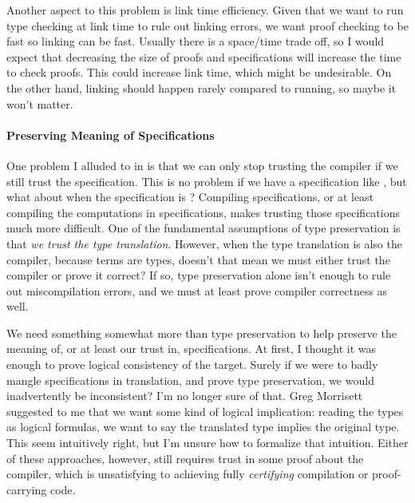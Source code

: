 Another aspect to this problem is link time efficiency.
Given that we want to run type checking at link time to rule out linking errors,
we want proof checking to be fast so linking can be fast.
Usually there is a space/time trade off, so I would expect that decreasing the
size of proofs and specifications will increase the time to check proofs.
This could increase link time, which might be undesirable.
On the other hand, linking should happen rarely compared to running, so maybe it
won't matter.

\paragraph{Preserving Meaning of Specifications}
One problem I alluded to in  is that we can only stop %
trusting the compiler if we still trust the specification.
This is no problem if we have a specification like
, but what about when the specification is
?
Compiling specifications, or at least compiling the computations in
specifications, makes trusting those specifications much more difficult.
One of the fundamental assumptions of type preservation is that \emph{we trust
  the type translation}.
However, when the type translation is also the compiler, because terms are
types, doesn't that mean we must either trust the compiler or prove it correct?
If so, type preservation alone isn't enough to rule out miscompilation errors,
and we must at least prove compiler correctness as well.

We need something somewhat more than type preservation to help preserve the
meaning of, or at least our trust in, specifications.
At first, I thought it was enough to prove logical consistency of the target.
Surely if we were to badly mangle specifications in translation, and prove type
preservation, we would inadvertently be inconsistent?
I'm no longer sure of that.
Greg Morrisett suggested to me that we want some kind of logical implication:
reading the types as logical formulas, we want to say the translated type
implies the original type.
This seem intuitively right, but I'm unsure how to formalize that intuition.
Either of these approaches, however, still requires trust in some proof about
the compiler, which is unsatisfying to achieving fully \emph{certifying}
compilation or proof-carrying code.

